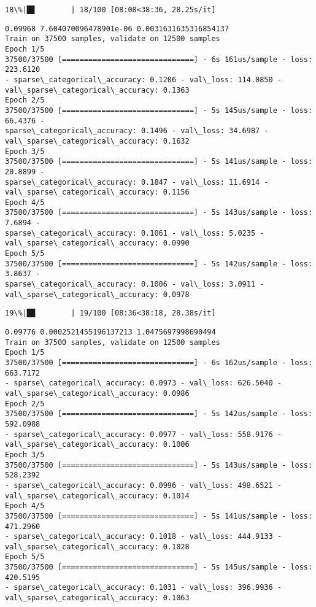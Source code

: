 \documentclass[11pt]{article}
\begin{document}
    \begin{Verbatim}[commandchars=\\\{\}]
 18\%|█▊        | 18/100 [08:08<38:36, 28.25s/it]
    \end{Verbatim}

    \begin{Verbatim}[commandchars=\\\{\}]
0.09968 7.604070096478901e-06 0.0031631635316854137
Train on 37500 samples, validate on 12500 samples
Epoch 1/5
37500/37500 [==============================] - 6s 161us/sample - loss: 223.6120
- sparse\_categorical\_accuracy: 0.1206 - val\_loss: 114.0850 -
val\_sparse\_categorical\_accuracy: 0.1363
Epoch 2/5
37500/37500 [==============================] - 5s 145us/sample - loss: 66.4376 -
sparse\_categorical\_accuracy: 0.1496 - val\_loss: 34.6987 -
val\_sparse\_categorical\_accuracy: 0.1632
Epoch 3/5
37500/37500 [==============================] - 5s 141us/sample - loss: 20.8899 -
sparse\_categorical\_accuracy: 0.1847 - val\_loss: 11.6914 -
val\_sparse\_categorical\_accuracy: 0.1156
Epoch 4/5
37500/37500 [==============================] - 5s 143us/sample - loss: 7.6894 -
sparse\_categorical\_accuracy: 0.1061 - val\_loss: 5.0235 -
val\_sparse\_categorical\_accuracy: 0.0990
Epoch 5/5
37500/37500 [==============================] - 5s 142us/sample - loss: 3.8637 -
sparse\_categorical\_accuracy: 0.1006 - val\_loss: 3.0911 -
val\_sparse\_categorical\_accuracy: 0.0978
    \end{Verbatim}

    \begin{Verbatim}[commandchars=\\\{\}]
 19\%|█▉        | 19/100 [08:36<38:18, 28.38s/it]
    \end{Verbatim}

    \begin{Verbatim}[commandchars=\\\{\}]
0.09776 0.0002521455196137213 1.0475697998690494
Train on 37500 samples, validate on 12500 samples
Epoch 1/5
37500/37500 [==============================] - 6s 162us/sample - loss: 663.7172
- sparse\_categorical\_accuracy: 0.0973 - val\_loss: 626.5040 -
val\_sparse\_categorical\_accuracy: 0.0986
Epoch 2/5
37500/37500 [==============================] - 5s 142us/sample - loss: 592.0988
- sparse\_categorical\_accuracy: 0.0977 - val\_loss: 558.9176 -
val\_sparse\_categorical\_accuracy: 0.1006
Epoch 3/5
37500/37500 [==============================] - 5s 143us/sample - loss: 528.2392
- sparse\_categorical\_accuracy: 0.0996 - val\_loss: 498.6521 -
val\_sparse\_categorical\_accuracy: 0.1014
Epoch 4/5
37500/37500 [==============================] - 5s 141us/sample - loss: 471.2960
- sparse\_categorical\_accuracy: 0.1018 - val\_loss: 444.9133 -
val\_sparse\_categorical\_accuracy: 0.1028
Epoch 5/5
37500/37500 [==============================] - 5s 145us/sample - loss: 420.5195
- sparse\_categorical\_accuracy: 0.1031 - val\_loss: 396.9936 -
val\_sparse\_categorical\_accuracy: 0.1063
    \end{Verbatim}
\end{document}
